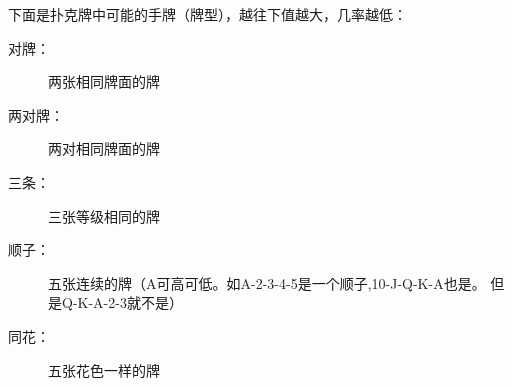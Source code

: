 \begin{exercise}
\label{poker}


下面是扑克牌中可能的手牌（牌型），越往下值越大，几率越低：

\begin{description}


\item [对牌：] 两张相同牌面的牌

\item [两对牌：] 两对相同牌面的牌

\item [三条：] 三张等级相同的牌

\item [顺子：] 五张连续的牌（A可高可低。如A-2-3-4-5是一个顺子,10-J-Q-K-A也是。  
但是Q-K-A-2-3就不是）

\item [同花：] 五张花色一样的牌


\end{description}
\end{exercise}
